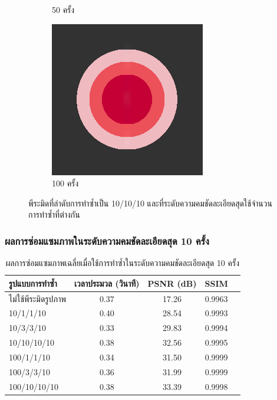 \documentclass[xcolor=dvipsnames, xetex,serif]{beamer}
\numberwithin{equation}{section}
\begin{document}
\begin{frame}
\begin{figure}[H]
\begin{subfigure}{0.4\linewidth}
					\caption{50 ครั้ง}
				\end{subfigure}
				\begin{subfigure}{0.4\linewidth}
					\centering
					\includegraphics[width=0.6\linewidth]{images/just10enough/only100time.png}			
					\caption{100 ครั้ง}
				\end{subfigure}
				\caption{{\footnotesize พีระมิดที่ลำดับการทำซ้ำเป็น 10/10/10 และที่ระดับความคมชัดละเอียดสุดใช้จำนวนการทำซ้ำที่ต่างกัน}}
			\end{figure}
		\end{frame}
		\begin{frame}
			\frametitle{ผลการซ่อมแซมภาพในระดับความคมชัดละเอียดสุด 10 ครั้ง}
			\begin{table}[H]
				\centering
				\begin{tabular}[ht]{|l|c|c|c|c|}
					\hline
					รูปแบบการทำซ้ำ  & เวลาประมวล  (วินาที) & PSNR (dB) & SSIM \\
					\hline
					ไม่ใช้พีระมิดรูปภาพ & 0.37 & 17.26 & 0.9963  \\
					10/1/1/10 & 0.40 & 28.54 & 0.9993 \\
					10/3/3/10 & 0.33 & 29.83  & 0.9994 \\
					10/10/10/10 & 0.38 & 32.56 & 0.9995 \\
					100/1/1/10 & 0.34 & 31.50 & 0.9999 \\
					100/3/3/10 & 0.36 & 31.99 & 0.9999 \\
					100/10/10/10 & 0.38 & 33.39 & 0.9998 \\
					\hline
				\end{tabular}
				\caption{{\small ผลการซ่อมแซมภาพเฉลี่ยเมื่อใช้การทำซ้ำในระดับความคมชัดละเอียดสุด 10 ครั้ง}}
			\end{table}	
		\end{frame}
\end{document}
